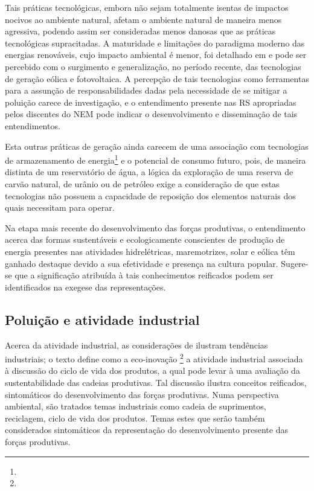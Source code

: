 \documentclass[
  12pt,       %
  openright,      %
  twoside,      %
  a4paper,      %
  english,      %
  french,       %
  spanish,      %
  brazil        %
  ]{abntex2}
\begin{document}
Tais práticas tecnológicas, embora não sejam totalmente isentas de impactos nocivos ao ambiente natural, afetam o ambiente natural de maneira menos agressiva, podendo assim ser consideradas menos danosas que as práticas tecnológicas supracitadas. A maturidade e limitações do paradigma moderno das energias renováveis, cujo impacto ambiental é menor, foi detalhado em  e pode ser percebido com o surgimento e generalização, no período recente, das tecnologias de geração eólica e fotovoltaica. A percepção de tais tecnologias como ferramentas para a assunção de responsabilidades dadas pela necessidade de se mitigar a poluição carece de investigação, e o entendimento presente nas RS apropriadas pelos discentes do NEM pode indicar o desenvolvimento e disseminação de tais entendimentos.

Esta outras práticas de geração ainda carecem de uma associação com tecnologias de  armazenamento de energia\footnote{} e o potencial de consumo futuro, pois, de maneira distinta de um reservatório de água, a lógica da exploração de uma reserva de carvão natural, de urânio ou de petróleo exige a consideração de que estas tecnologias não possuem a capacidade de reposição dos elementos naturais dos quais necessitam para operar. 

Na etapa mais recente do desenvolvimento das forças produtivas, o entendimento acerca das formas sustentáveis e ecologicamente conscientes de produção de energia presentes nas atividades hidrelétricas, maremotrizes, solar e eólica têm ganhado destaque devido a sua efetividade e presença na cultura popular. Sugere-se que a significação atribuída à tais conhecimentos reificados podem ser identificados na exegese das representações.


\subsection{Poluição e atividade industrial}

Acerca da atividade industrial, as considerações de  ilustram tendências industriais; o texto define como a eco-inovação \footnote{} a atividade industrial associada à discussão do ciclo de vida dos produtos, a qual pode levar à uma avaliação da sustentabilidade das cadeias produtivas. Tal discussão ilustra conceitos reificados, sintomáticos do desenvolvimento das forças produtivas. Numa perspectiva ambiental, são tratados temas industriais como cadeia de suprimentos, reciclagem, ciclo de vida dos produtos. Temas estes que serão também considerados sintomáticos da representação do desenvolvimento presente das forças produtivas.
\end{document}
